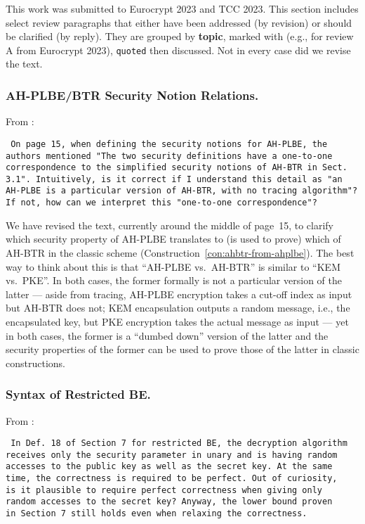 This work was submitted to
Eurocrypt 2023 and TCC 2023.
This section includes select review paragraphs
that either have been addressed (by revision)
or should be clarified (by reply).
They are grouped by \textbf{topic},
marked with 
(e.g.,  for review A from Eurocrypt 2023),
\texttt{quoted} then discussed.
Not in every case did we revise the text.

\subsubsection{AH-PLBE/BTR Security Notion Relations.}
From :

\texttt{
On page 15, when defining the security notions for AH-PLBE, the \\
authors mentioned "The two security definitions have a one-to-one \\
correspondence to the simplified security notions of AH-BTR in Sect. \\
3.1". Intuitively, is it correct if I understand this detail as "an \\
AH-PLBE is a particular version of AH-BTR, with no tracing algorithm"? \\
If not, how can we interpret this "one-to-one correspondence"?
}

We have revised the text, currently around the middle of page~15, to clarify
which security property of AH-PLBE translates to (is used to prove)
which of AH-BTR in the classic scheme
(Construction~\ref{con:ahbtr-from-ahplbe}).
The best way to think about this is that
``AH-PLBE vs.~AH-BTR'' is similar to ``KEM vs.~PKE''.
In both cases, the former formally is not a particular version of the latter
--- aside from tracing,
AH-PLBE encryption takes a cut-off index as input but AH-BTR does not;
KEM encapsulation outputs a random message, i.e., the encapsulated key,
but PKE encryption takes the actual message as input ---
yet in both cases, the former is a ``dumbed down'' version of the latter
and the security properties of the former can be used to prove
those of the latter in classic constructions.

\subsubsection{Syntax of Restricted BE.}
From :

\texttt{
In Def. 18 of Section 7 for restricted BE, the decryption algorithm \\
receives only the security parameter in unary and is having random \\
accesses to the public key as well as the secret key. At the same \\
time, the correctness is required to be perfect. Out of curiosity, \\
is it plausible to require perfect correctness when giving only \\
random accesses to the secret key? Anyway, the lower bound proven \\
in Section 7 still holds even when relaxing the correctness.
}

